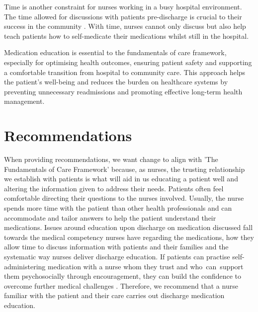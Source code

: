 \documentclass[british,12pt,a4paper]{article}
\begin{document}
Time is another constraint for nurses working in a busy hospital environment. The time allowed for discussions with patients pre-discharge is crucial to their success in the community \parencite{Sanjai2019}. With time, nurses cannot only discuss but also help teach patients how to self-medicate their medications whilst still in the hospital.

Medication education is essential to the fundamentals of care framework, especially for optimising health outcomes, ensuring patient safety and supporting a comfortable transition from hospital to community care. This approach helps the patient's well-being and reduces the burden on healthcare systems by preventing unnecessary readmissions and promoting effective long-term health management.

\section{Recommendations}
When providing recommendations, we want change to align with 'The Fundamentals of Care Framework' \parencite{Dempsey2013} because, as nurses, the trusting relationship we establish with patients is what will aid in us educating a patient well and altering the information given to address their needs. Patients often feel comfortable directing their questions to the nurses involved. Usually, the nurse spends more time with the patient than other health professionals and can accommodate and tailor answers to help the patient understand their medications. Issues around education upon discharge on medication discussed fall towards the medical competency nurses have regarding the medications, how they allow time to discuss information with patients and their families and the systematic way nurses deliver discharge education. If patients can practise self-administering medication with a nurse whom they trust and who can support them psychosocially through encouragement, they can build the confidence to overcome further medical challenges \parencite{Sanjai2019}. Therefore, we recommend that a nurse familiar with the patient and their care carries out discharge medication education.
\end{document}

